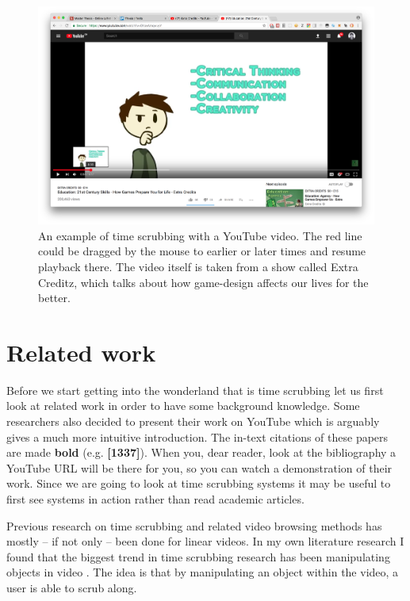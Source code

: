 \begin{figure}
\centering
\includegraphics[width=1.35\textwidth, center]{time_scrubbing_mechanism.png} %
\caption{An example of time scrubbing with a YouTube video. The red line could be dragged by the mouse to earlier or later times and resume playback there. The video itself is taken from a show called Extra Creditz, which talks about how game-design affects our lives for the better.}
\label{fig:normal_time_scrubbing}
\end{figure}

\section{Related work}
Before we start getting into the wonderland that is time scrubbing let us first look at related work in order to have some background knowledge. Some researchers also decided to present their work on YouTube which is arguably gives a much more intuitive introduction. The in-text citations of these papers are made \textbf{bold} (e.g. \textbf{[1337]}). When you, dear reader, look at the bibliography a YouTube URL will be there for you, so you can watch a demonstration of their work. Since we are going to look at time scrubbing systems it may be useful to first see systems in action rather than read academic articles.

Previous research on time scrubbing and related video browsing methods has mostly -- if not only -- been done for linear videos. In my own literature research I found that the biggest trend in time scrubbing research has been manipulating objects in video \cite{nguyen2013, shah2013, goldman2008, dragicevic2008, kimber2007}. The idea is that by manipulating an object within the video, a user is able to scrub along. 

